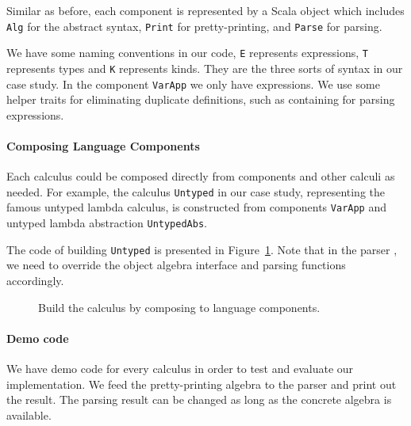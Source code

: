 Similar as before, each component is represented by a Scala object which includes \lstinline{Alg} for the abstract syntax, \lstinline{Print} for pretty-printing, and \lstinline{Parse} for parsing.

We have some naming conventions in our code, \lstinline{E} represents
expressions, \lstinline{T} represents types and \lstinline{K}
represents kinds. They are the three sorts of syntax in our case study.
In the component \lstinline{VarApp} we only have expressions. We use some helper traits for eliminating duplicate definitions, such as  containing  for parsing expressions.


\paragraph{Composing Language Components}
Each calculus could be composed directly from components and other
calculi as needed. For example, the calculus \lstinline{Untyped} in our case study,
representing the famous untyped lambda calculus, is constructed from components \lstinline{VarApp}
and untyped lambda abstraction \lstinline{UntypedAbs}.

The code of building \lstinline{Untyped} is presented in Figure~\ref{fig:casestudy-untyped}. Note that in the parser , we need to override the object algebra interface and
parsing functions accordingly.

\begin{figure}[ht]
\caption{Build the  calculus by composing to language components.}\label{fig:casestudy-untyped}
\end{figure}

\paragraph{Demo code}
We have demo code for every calculus in order to test and evaluate our implementation.
We feed the pretty-printing algebra to the parser and print out the result.
The parsing result can be changed as long as the concrete algebra is available.


